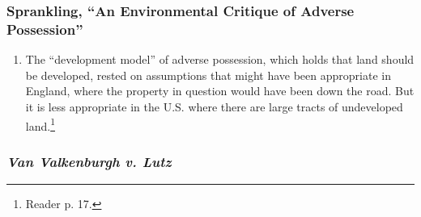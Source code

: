 \subsubsection{Sprankling, ``An Environmental Critique of Adverse Possession''}

\begin{enumerate}
    \item The ``development model'' of adverse possession, which holds that land 
    should be developed, rested on assumptions that might have been appropriate 
    in England, where the property in question would have been down the road. 
    But it is less appropriate in the U.S. where there are large tracts of 
    undeveloped land.\footnote{Reader p. 17.}
\end{enumerate}

\subsubsection{\emph{Van Valkenburgh v. Lutz}}


